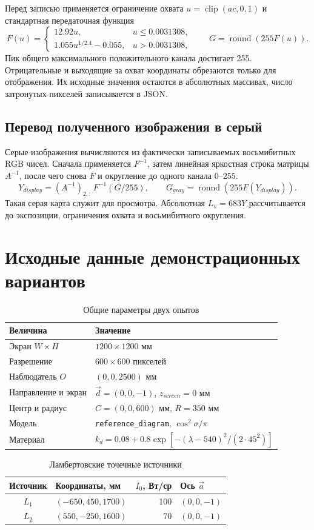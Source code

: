 \documentclass[a4paper,12pt]{article}
\newcommand{\code}[1]{\nolinkurl{#1}}
\newcommand{\Lv}{L_{\mathrm v}}
\begin{document}
Перед записью применяется ограничение охвата $u=\operatorname{clip}(ac,0,1)$ и стандартная передаточная функция
\[
 F(u)=\begin{cases}
 12.92u,&u\leq0.0031308,\\
 1.055u^{1/2.4}-0.055,&u>0.0031308,
 \end{cases}
 \qquad G=\operatorname{round}(255F(u)).
\]
Пик общего максимального положительного канала достигает 255. Отрицательные и выходящие за охват координаты обрезаются только для отображения. Их исходные значения остаются в абсолютных массивах, число затронутых пикселей записывается в JSON.

\subsection{Перевод полученного изображения в серый}

Серые изображения вычисляются из фактически записываемых восьмибитных RGB чисел. Сначала применяется $F^{-1}$, затем линейная яркостная строка матрицы $A^{-1}$, после чего снова $F$ и округление до одного канала $0$--$255$.
\[
 Y_{display}=(A^{-1})_{2,:}\,F^{-1}(G/255),\qquad
 G_{gray}=\operatorname{round}(255F(Y_{display})).
\]
Такая серая карта служит для просмотра. Абсолютная $\Lv=683Y$ рассчитывается до экспозиции, ограничения охвата и восьмибитного округления.

\clearpage
\section{Исходные данные демонстрационных вариантов}

\begin{table}[H]\centering\small
\caption{Общие параметры двух опытов}
\begin{tabularx}{\textwidth}{@{}lX@{}}\toprule
Величина & Значение\\\midrule
Экран $W\times H$ & $1200\times1200$ мм\\
Разрешение & $600\times600$ пикселей\\
Наблюдатель $O$ & $(0,0,2500)$ мм\\
Направление и экран & $\vec d=(0,0,-1)$, $z_{screen}=0$ мм\\
Центр и радиус & $C=(0,0,600)$ мм, $R=350$ мм\\
Модель & \code{reference_diagram}, $\cos^2\sigma/\pi$\\
Материал & $k_d=0.08+0.8\exp[-(\lambda-540)^2/(2\cdot45^2)]$\\\bottomrule
\end{tabularx}
\end{table}
\begin{table}[H]\centering\small
\caption{Ламбертовские точечные источники}
\begin{tabular}{@{}clrl@{}}\toprule
Источник & Координаты, мм & $I_0$, Вт/ср & Ось $\vec a$\\\midrule
$L_1$ & $(-650,450,1700)$ & 100 & $(0,0,-1)$\\
$L_2$ & $(550,-250,1600)$ & 70 & $(0,0,-1)$\\\bottomrule
\end{tabular}
\end{table}
\end{document}

